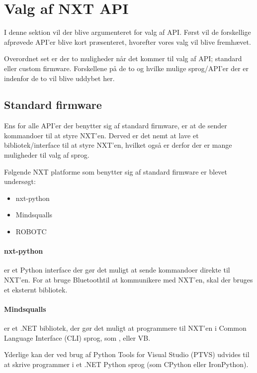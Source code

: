 \section{Valg af NXT API}
\label{nxt_api}

I denne sektion vil der blive argumenteret for valg af API.
Først vil de forskellige afprøvede API'er blive kort præsenteret, hvorefter vores valg vil blive fremhævet.

Overordnet set er der to muligheder når det kommer til valg af API; standard eller custom firmware.
Forskellene på de to og hvilke mulige sprog/API'er der er indenfor de to vil blive uddybet her.

\subsection{Standard firmware}
Ens for alle API'er der benytter sig af standard firmware, er at de sender kommandoer til at styre NXT'en. 
Derved er det nemt at lave et bibliotek/interface til at styre NXT'en, hvilket også er derfor der er mange muligheder til valg af sprog.

Følgende NXT platforme som benytter sig af standard firmware er blevet undersøgt:
\begin{itemize}
\item{nxt-python}
\item{Mindsqualls}
\item{ROBOTC}
\end{itemize}

\paragraph{nxt-python} er et Python interface der gør det muligt at sende kommandoer direkte til NXT'en.
For at bruge Bluetooth\textregistered til at kommunikere med NXT'en, skal der bruges et eksternt bibliotek.\cite{nxt-python}

\paragraph{Mindsqualls} er et .NET bibliotek, der gør det muligt at programmere til NXT'en i Common Language Interface (CLI) sprog, som \csharp, \fsharp eller VB.\cite{mindsqualls}

Yderlige kan der ved brug af Python Tools for Visual Studio (PTVS) udvides til at skrive programmer i et .NET Python sprog (som CPython eller IronPython).\cite{ptvs}

